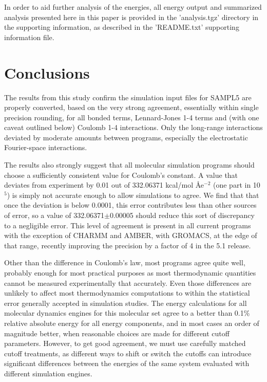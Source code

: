 In order to aid further analysis of the energies, all energy output
and summarized analysis presented here in this paper is provided in
the 'analysis.tgz' directory in the supporting information, as
described in the 'README.txt' supporting information file.

\section*{Conclusions}
The results from this study confirm the simulation input files for
SAMPL5 are properly converted, based on the very strong agreement,
essentially within single precision rounding, for all bonded terms,
Lennard-Jones 1-4 terms and (with one caveat outlined below) Coulomb
1-4 interactions. Only the long-range interactions deviated by
moderate amounts between programs, especially the electrostatic
Fourier-space interactions.  

The results also strongly suggest that all molecular simulation
programs should choose a sufficiently consistent value for Coulomb's
constant. A value that deviates from experiment by 0.01 out of
332.06371 kcal/mol \AA e$^{-2}$ (one part in 10$^{5}$) is simply not
accurate enough to allow simulations to agree.  We find that that once
the deviation is below 0.0001, this error contributes less than other
sources of error, so a value of 332.06371$\pm$0.00005 should reduce
this sort of discrepancy to a negligible error.  This level of
agreement is present in all current programs with the exception of
CHARMM and AMBER, with GROMACS, at the edge of that range, recently
improving the precision by a factor of 4 in the 5.1 release.

Other than the difference in Coulomb's law, most programs agree quite
well, probably enough for most practical purposes as most thermodynamic
quantities cannot be measured experimentally that accurately.  Even those differences
are unlikely to affect most thermodynamics computations to within the
statistical error generally accepted in simulation studies. The energy
calculations for all molecular dynamics engines for this molecular set
agree to a better than 0.1\% relative absolute energy for all energy
components, and in most cases an order of magnitude better, when
reasonable choices are made for different cutoff parameters. However,
to get good agreement, we must use carefully matched cutoff
treatments, as different ways to shift or switch the cutoffs can
introduce significant differences between the energies of the same
system evaluated with different simulation engines.

